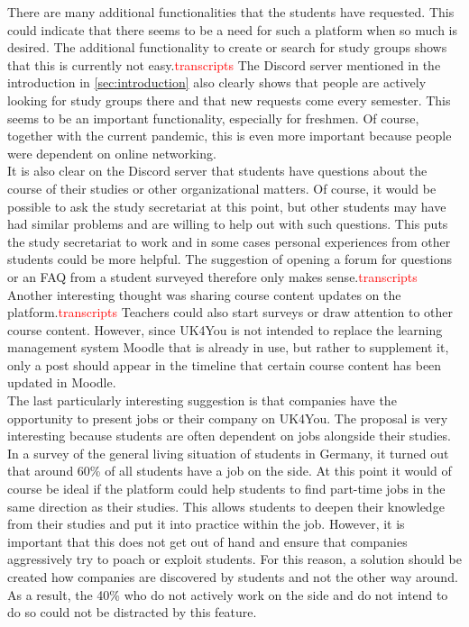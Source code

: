 There are many additional functionalities that the students have requested.
This could indicate that there seems to be a need for such a platform when so much is desired.
The additional functionality to create or search for study groups shows that this is currently not easy.\textcolor{red}{transcripts}
The Discord server mentioned in the introduction in \autoref{sec:introduction} also clearly shows that people are actively looking for study groups there and that new requests come every semester.
This seems to be an important functionality, especially for freshmen.
Of course, together with the current pandemic, this is even more important because people were dependent on online networking.\\

It is also clear on the Discord server that students have questions about the course of their studies or other organizational matters.
Of course, it would be possible to ask the study secretariat at this point, but other students may have had similar problems and are willing to help out with such questions.
This puts the study secretariat to work and in some cases personal experiences from other students could be more helpful.
The suggestion of opening a forum for questions or an FAQ from a student surveyed therefore only makes sense.\textcolor{red}{transcripts}
Another interesting thought was sharing course content updates on the platform.\textcolor{red}{transcripts}
Teachers could also start surveys or draw attention to other course content.
However, since UK4You is not intended to replace the learning management system Moodle that is already in use, but rather to supplement it, only a post should appear in the timeline that certain course content has been updated in Moodle.\\

The last particularly interesting suggestion is that companies have the opportunity to present jobs or their company on UK4You.
The proposal is very interesting because students are often dependent on jobs alongside their studies.
In a survey of the general living situation of students in Germany, it turned out that around 60\% of all students have a job on the side\cite{students-work}.
At this point it would of course be ideal if the platform could help students to find part-time jobs in the same direction as their studies.
This allows students to deepen their knowledge from their studies and put it into practice within the job.
However, it is important that this does not get out of hand and ensure that companies aggressively try to poach or exploit students.
For this reason, a solution should be created how companies are discovered by students and not the other way around.
As a result, the 40\% who do not actively work on the side and do not intend to do so could not be distracted by this feature.\\

